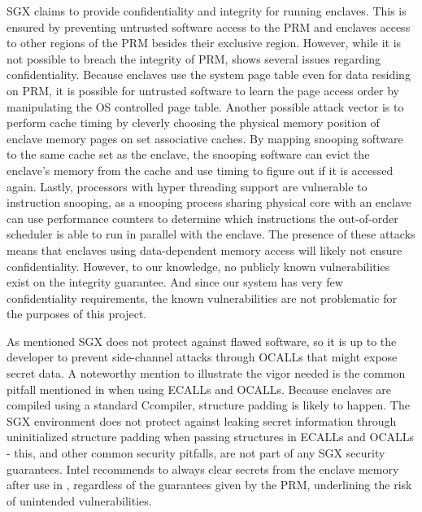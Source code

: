 \documentclass[12pt]{article}
\newcommand\cpp{C\nolinebreak[4]\hspace{-.05em}\raisebox{.4ex}{\relsize{-3}{\textbf{++}}}}
\begin{document}
    SGX claims to provide confidentiality and integrity for running enclaves.
    This is ensured by preventing untrusted software access to the PRM and enclaves access to other regions of the PRM besides their exclusive region.
    However, while it is not possible to breach the integrity of PRM, \cite{intel-sgx-explained} shows several issues regarding confidentiality.
    Because enclaves use the system page table even for data residing on PRM, it is possible for untrusted software to learn the page access order by manipulating the OS controlled page table.
    Another possible attack vector is to perform cache timing by cleverly choosing the physical memory position of enclave memory pages on set associative caches.
    By mapping snooping software to the same cache set as the enclave, the snooping software can evict the enclave's memory from the cache and use timing to figure out if it is accessed again.
    Lastly, processors with hyper threading support are vulnerable to instruction snooping, as a snooping process sharing physical core with an enclave can use performance counters to determine which instructions the out-of-order scheduler is able to run in parallel with the enclave.
    The presence of these attacks means that enclaves using data-dependent memory access will likely not ensure confidentiality.
    However, to our knowledge, no publicly known vulnerabilities exist on the integrity guarantee. 
    And since our system has very few confidentiality requirements, the known vulnerabilities are not problematic for the purposes of this project.

    As mentioned SGX does not protect against flawed software, so it is up to the developer to prevent side-channel attacks through OCALLs that might expose secret data.
    A noteworthy mention to illustrate the vigor needed is the common pitfall mentioned in \cite{sgx-dev-guide} when using ECALLs and OCALLs.
    Because enclaves are compiled using a standard \cpp compiler, structure padding is likely to happen.
    The SGX environment does not protect against leaking secret information through uninitialized structure padding when passing structures in ECALLs and OCALLs - this, and other common security pitfalls, are not part of any SGX security guarantees.
    Intel recommends to always clear secrets from the enclave memory after use in \cite{sgx-dev-guide}, regardless of the guarantees given by the PRM, underlining the risk of unintended vulnerabilities.
\end{document}
